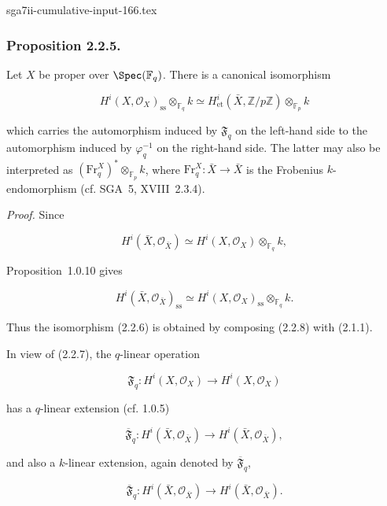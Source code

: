 \begin{filecontents*}{sga7ii-cumulative-input-166.tex}
\subsubsection*{Proposition 2.2.5.}
Let $X$ be proper over $\Spec(\mathbb F_q)$. There is a canonical
isomorphism

\begin{equation}\tag{2.2.6}
H^i(X,\mathcal O_X)_{\mathrm{ss}}\otimes_{\mathbb F_q}k
\simeq
H^i_{\mathrm{et}}(\bar X,\mathbb Z/p\mathbb Z)
\otimes_{\mathbb F_p}k
\end{equation}

which carries the automorphism induced by $\mathfrak F_q$ on the left-hand
side to the automorphism induced by $\varphi_q^{-1}$ on the right-hand side.
The latter may also be interpreted as
$(\mathrm{Fr}_q^X)^*\otimes_{\mathbb F_p}k$, where
$\mathrm{Fr}_q^X:\bar X\longrightarrow\bar X$ is the Frobenius
$k$-endomorphism (cf. SGA~5, XVIII~2.3.4).

\medskip
\noindent\emph{Proof.}
Since

\begin{equation}\tag{2.2.7}
H^i(\bar X,\mathcal O_{\bar X})\simeq
H^i(X,\mathcal O_X)\otimes_{\mathbb F_q}k,
\end{equation}

Proposition~1.0.10 gives

\begin{equation}\tag{2.2.8}
H^i(\bar X,\mathcal O_{\bar X})_{\mathrm{ss}}\simeq
H^i(X,\mathcal O_X)_{\mathrm{ss}}\otimes_{\mathbb F_q}k.
\end{equation}

Thus the isomorphism (2.2.6) is obtained by composing (2.2.8) with
(2.1.1).

In view of (2.2.7), the $q$-linear operation

\begin{equation}\tag{2.2.9}
\mathfrak F_q:H^i(X,\mathcal O_X)\longrightarrow H^i(X,\mathcal O_X)
\end{equation}

has a $q$-linear extension (cf. 1.0.5)

\begin{equation}\tag{2.2.10}
\overline{\mathfrak F}_q:H^i(\bar X,\mathcal O_{\bar X})
\longrightarrow H^i(\bar X,\mathcal O_{\bar X}),
\end{equation}

and also a $k$-linear extension, again denoted by
$\overline{\mathfrak F}_q$,

\begin{equation}\tag{2.2.11}
\overline{\mathfrak F}_q:H^i(\bar X,\mathcal O_{\bar X})
\longrightarrow H^i(\bar X,\mathcal O_{\bar X}).
\end{equation}


\end{filecontents*}
